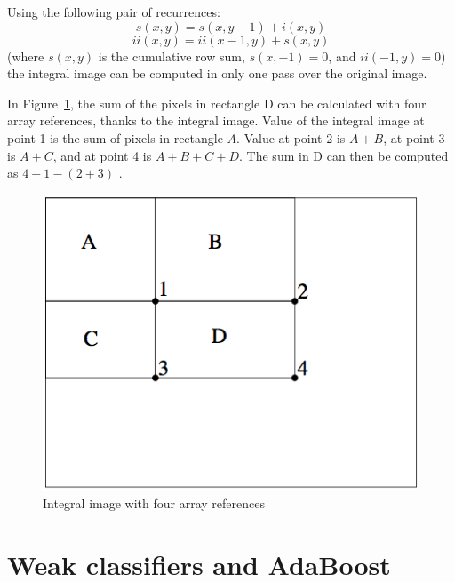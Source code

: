 \noindent Using the following pair of recurrences: 
\begin{equation}
s(x,y) = s(x,y - 1) + i(x,y)
\end{equation}
\begin{equation}
ii(x,y) = ii(x - 1,y) + s(x,y)
\end{equation}
(where $ s(x,y) $ is the cumulative row sum, $ s(x,-1) = 0 $, and $ ii(-1,y) = 0 $) the integral image can be computed in only one pass over the original image. 
\newline

\noindent In Figure~\ref{integral_image_four_array}, the sum of the pixels in rectangle D can be calculated with four array references, thanks to the integral image. Value of the integral image at point 1 is the sum of pixels in rectangle $ A $. Value at point 2 is $ A + B $, at point 3 is $ A + C $, and at  point 4 is $ A + B + C + D $. The sum in D can then be computed as $ 4 + 1 - (2 + 3) $ \cite{VIO01}. 
\newline

\begin{figure}[!h]
\begin{center}
\noindent \includegraphics[scale=0.6]{figures/integral_image_four_array} 
\newline
\caption{Integral image with four array references}
\label{integral_image_four_array}
\end{center} 
\end{figure}

\section{Weak classifiers and AdaBoost}

